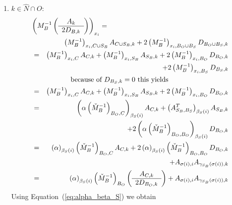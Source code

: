 \documentclass[a4paper]{article}
\begin{document}
\begin{enumerate}
\item $k \in \hat{N} \cap O$:
\begin{eqnarray}
\lefteqn{\left(M_{B}^{-1}
           \left(\begin{array}{c}
                   A_{k} \\
	           \hline
	           2D_{B, k}
	         \end{array}
           \right)
         \right)_{x_{i}}
=} \nonumber \\
&&
\left(M_{B}^{-1}\right)_{x_{i}, C \cup S_{B}}A_{C \cup S_{B}, k}
+2\left(M_{B}^{-1}\right)_{x_{i}, B_{O} \cup B_{S}}D_{B_{O} \cup B_{S}, k}
\nonumber \\
&=&
\left(M_{B}^{-1}\right)_{x_{i}, C}A_{C, k}
+\left(M_{B}^{-1}\right)_{x_{i}, S_{B}}A_{S_{B}, k}
+2\left(M_{B}^{-1}\right)_{x_{i}, B_{O}}D_{B_{O}, k}
\nonumber \\
&&
+2\left(M_{B}^{-1}\right)_{x_{i}, B_{S}}D_{B_{S}, k}
\nonumber \\
&&\begin{minipage}{8cm}
because of $D_{B_{S}, k}=0$ this yields
\end{minipage}
\nonumber \\
&=&
\left(M_{B}^{-1}\right)_{x_{i}, C}A_{C, k}
+\left(M_{B}^{-1}\right)_{x_{i}, S_{B}}A_{S_{B}, k}
+2\left(M_{B}^{-1}\right)_{x_{i}, B_{O}}D_{B_{O}, k}
\nonumber \\
&=&
\left(\alpha\left(\check{M}_{B}^{-1}\right)_{B_{O}, C}\right)_{\beta_{S}(i)}
  A_{C, k}
+\left(A_{S_{B}, B_{S}}^{T}\right)_{\beta_{S}(i)}A_{S_{B},k}
\nonumber \\
&&
+2\left(\alpha\left(\check{M}_{B}^{-1}\right)_{B_{O}, B_{O}}\right)_{
  \beta_{S}(i)}D_{B_{O},k}
\nonumber \\
&=&
\left(\alpha\right)_{\beta_{S}(i)}\left(\check{M}_{B}^{-1}\right)_{B_{O}, C}
  A_{C, k}
+2\left(\alpha\right)_{\beta_{S}(i)}\left(\check{M}_{B}^{-1}\right)_{B_{O},
  B_{O}}D_{B_{O}, k}
\nonumber \\
&&
+A_{\sigma(i), i}A_{\gamma_{S_{B}}(\sigma(i)), k}
\nonumber \\
&=&
\left(\alpha\right)_{\beta_{S}(i)}\left(\check{M}_{B}^{-1}\right)_{B_{O}}
\left(\begin{array}{c}
        A_{C,k} \\
	\hline
	2D_{B_{O},k}
       \end{array}
\right)
+A_{\sigma(i), i}A_{\gamma_{S_{B}}(\sigma(i)), k}
\nonumber
\end{eqnarray}
Using Equation~(\ref{eq:alpha_beta_S}) we obtain
\begin{eqnarray}

\end{eqnarray}
\end{enumerate}
\end{document}
